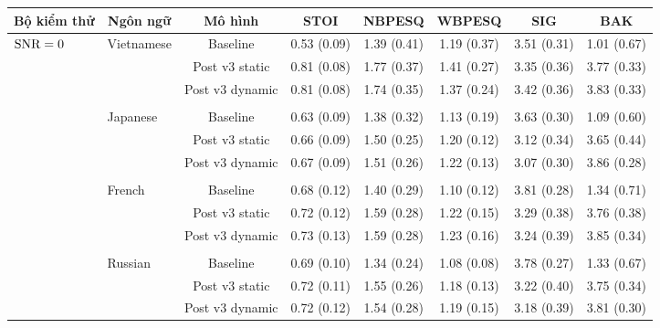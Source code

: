 		\clearpage
	
		\begin{sidewaystable} \ContinuedFloat
			\centering
			\begin{subtable}{\textwidth}
				\centering
				\begin{tabular}{llcccccc}
					\hline
					\multicolumn{1}{c}{\textbf{Bộ kiểm thử}}	& \multicolumn{1}{c}{\textbf{Ngôn ngữ}}	& \textbf{Mô hình}	& \textbf{STOI}	& \textbf{NBPESQ}	& \textbf{WBPESQ}	& \textbf{SIG}	& \textbf{BAK} \\
					\hline
					\multirow{27}{*}{$\text{SNR}=0$}       & \multirow{3}{*}{Vietnamese}     &Baseline       & 0.53 (0.09)   & 1.39 (0.41)   & 1.19 (0.37)   & 3.51 (0.31)   & 1.01 (0.67) \\
					&               &Post v3 static & 0.81 (0.08)   & 1.77 (0.37)   & 1.41 (0.27)   & 3.35 (0.36)   & 3.77 (0.33) \\
					&				&Post v3 dynamic        & 0.81 (0.08)   & 1.74 (0.35)   & 1.37 (0.24)   & 3.42 (0.36)   & 3.83 (0.33) \\
					&&&&&&&\\
					& \multirow{3}{*}{Japanese}     &Baseline       & 0.63 (0.09)   & 1.38 (0.32)   & 1.13 (0.19)   & 3.63 (0.30)   & 1.09 (0.60) \\
					&               &Post v3 static & 0.66 (0.09)   & 1.50 (0.25)   & 1.20 (0.12)   & 3.12 (0.34)   & 3.65 (0.44) \\
					&               &Post v3 dynamic        & 0.67 (0.09)   & 1.51 (0.26)   & 1.22 (0.13)   & 3.07 (0.30)   & 3.86 (0.28) \\
					&&&&&&&\\
					& \multirow{3}{*}{French}       &Baseline       & 0.68 (0.12)   & 1.40 (0.29)   & 1.10 (0.12)   & 3.81 (0.28)   & 1.34 (0.71) \\
					&               &Post v3 static & 0.72 (0.12)   & 1.59 (0.28)   & 1.22 (0.15)   & 3.29 (0.38)   & 3.76 (0.38) \\
					&               &Post v3 dynamic        & 0.73 (0.13)   & 1.59 (0.28)   & 1.23 (0.16)   & 3.24 (0.39)   & 3.85 (0.34) \\
					&&&&&&&\\
					& \multirow{3}{*}{Russian}      &Baseline       & 0.69 (0.10)   & 1.34 (0.24)   & 1.08 (0.08)   & 3.78 (0.27)   & 1.33 (0.67) \\
					&               &Post v3 static & 0.72 (0.11)   & 1.55 (0.26)   & 1.18 (0.13)   & 3.22 (0.40)   & 3.75 (0.34) \\
					&               &Post v3 dynamic        & 0.72 (0.12)   & 1.54 (0.28)   & 1.19 (0.15)   & 3.18 (0.39)   & 3.81 (0.30) \\

\end{tabular}
\end{subtable}
\end{sidewaystable}
